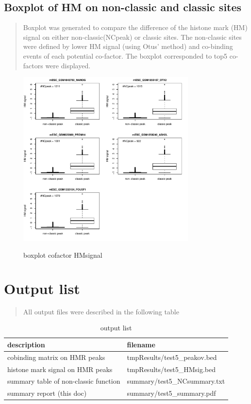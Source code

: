 \documentclass[11pt,a4paper]{article}
\begin{document}
\subsection{Boxplot of HM on non-classic and classic sites}
\begin{quotation}
Boxplot was generated to compare the difference of the histone mark (HM) signal on either non-classic(NCpeak) or classic sites. The non-classic sites were defined by lower HM signal (using Otus' method) and co-binding events of each potential co-factor. The boxplot corresponded to top5 co-factors were displayed.  
\end{quotation}
\begin{figure}[h]
        \caption{boxplot cofactor HMsignal} \label{fig:profileunion}
        \setlength{\abovecaptionskip}{0pt}
        \setlength{\belowcaptionskip}{10pt}
        \centering
        {\includegraphics[width=0.8\textwidth]{test5_coTF_HMsignal.pdf}}
\end{figure}

\newpage
\newpage
\section{Output list}
\begin{quotation}
All output files were described in the following table
\end{quotation}
\begin{table}[h]
\caption{output list}\label{bstable}
\begin{tabularx}{\textwidth}{ |X|l| }
    
\hline
description & filename \\
\hline
cobinding matrix on HMR peaks & tmpResults/test5\_peakov.bed \\
\hline
histone mark signal on HMR peaks & tmpResults/test5\_HMsig.bed \\
\hline
summary table of non-classic function & summary/test5\_NCsummary.txt \\
\hline
summary report (this doc) & summary/test5\_summary.pdf \\
\hline

\end{tabularx}
\end{table} 
\end{document}
